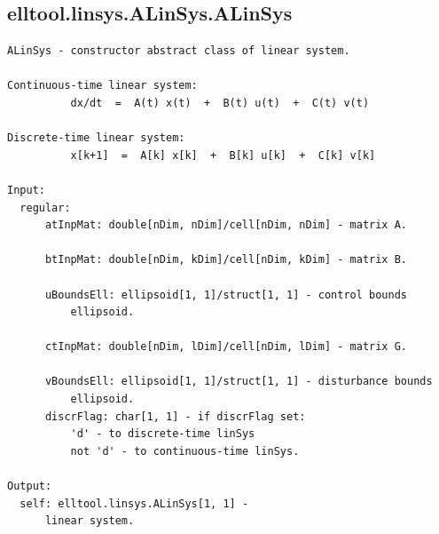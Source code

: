 \documentclass[letterpaper,10pt,english]{sphinxmanual}
\begin{document}
\subsection{elltool.linsys.ALinSys.ALinSys}
\label{chap_functions:elltool-linsys-alinsys-alinsys}
\begin{Verbatim}[commandchars=\\\{\}]
ALinSys - constructor abstract class of linear system.

Continuous-time linear system:
          dx/dt  =  A(t) x(t)  +  B(t) u(t)  +  C(t) v(t)

Discrete-time linear system:
          x[k+1]  =  A[k] x[k]  +  B[k] u[k]  +  C[k] v[k]

Input:
  regular:
      atInpMat: double[nDim, nDim]/cell[nDim, nDim] - matrix A.

      btInpMat: double[nDim, kDim]/cell[nDim, kDim] - matrix B.

      uBoundsEll: ellipsoid[1, 1]/struct[1, 1] - control bounds
          ellipsoid.

      ctInpMat: double[nDim, lDim]/cell[nDim, lDim] - matrix G.

      vBoundsEll: ellipsoid[1, 1]/struct[1, 1] - disturbance bounds
          ellipsoid.
      discrFlag: char[1, 1] - if discrFlag set:
          'd' - to discrete-time linSys
          not 'd' - to continuous-time linSys.

Output:
  self: elltool.linsys.ALinSys[1, 1] -
      linear system.
\end{Verbatim}
\end{document}
